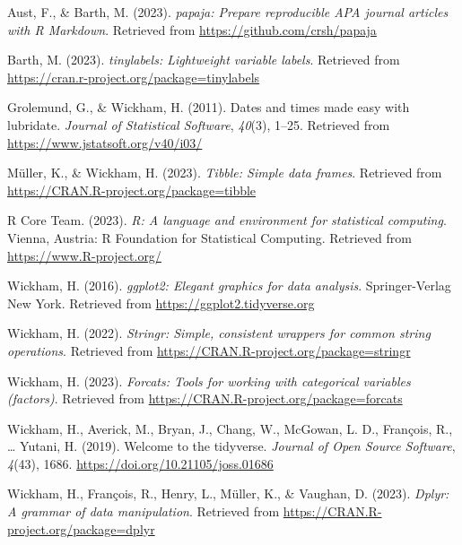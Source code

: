 \documentclass[
  man,floatsintext]{apa6}
\newlength{\cslhangindent}
\newlength{\cslentryspacingunit} %
\newenvironment{CSLReferences}[2] %
 {%
  \setlength{\parindent}{0pt}
  \ifodd #1
  \let\oldpar\par
  \def\par{\hangindent=\cslhangindent\oldpar}
  \fi
  \setlength{\parskip}{#2\cslentryspacingunit}
 }%
 {}
\begin{document}
\hypertarget{refs}{}
\begin{CSLReferences}{1}{0}
\leavevmode{}%
Aust, F., \& Barth, M. (2023). \emph{{papaja}: {Prepare} reproducible {APA} journal articles with {R Markdown}}. Retrieved from \url{https://github.com/crsh/papaja}

\leavevmode{}%
Barth, M. (2023). \emph{{tinylabels}: Lightweight variable labels}. Retrieved from \url{https://cran.r-project.org/package=tinylabels}

\leavevmode{}%
Grolemund, G., \& Wickham, H. (2011). Dates and times made easy with {lubridate}. \emph{Journal of Statistical Software}, \emph{40}(3), 1--25. Retrieved from \url{https://www.jstatsoft.org/v40/i03/}

\leavevmode{}%
Müller, K., \& Wickham, H. (2023). \emph{Tibble: Simple data frames}. Retrieved from \url{https://CRAN.R-project.org/package=tibble}

\leavevmode{}%
R Core Team. (2023). \emph{R: A language and environment for statistical computing}. Vienna, Austria: R Foundation for Statistical Computing. Retrieved from \url{https://www.R-project.org/}

\leavevmode{}%
Wickham, H. (2016). \emph{ggplot2: Elegant graphics for data analysis}. Springer-Verlag New York. Retrieved from \url{https://ggplot2.tidyverse.org}

\leavevmode{}%
Wickham, H. (2022). \emph{Stringr: Simple, consistent wrappers for common string operations}. Retrieved from \url{https://CRAN.R-project.org/package=stringr}

\leavevmode{}%
Wickham, H. (2023). \emph{Forcats: Tools for working with categorical variables (factors)}. Retrieved from \url{https://CRAN.R-project.org/package=forcats}

\leavevmode{}%
Wickham, H., Averick, M., Bryan, J., Chang, W., McGowan, L. D., François, R., \ldots{} Yutani, H. (2019). Welcome to the {tidyverse}. \emph{Journal of Open Source Software}, \emph{4}(43), 1686. \url{https://doi.org/10.21105/joss.01686}

\leavevmode{}%
Wickham, H., François, R., Henry, L., Müller, K., \& Vaughan, D. (2023). \emph{Dplyr: A grammar of data manipulation}. Retrieved from \url{https://CRAN.R-project.org/package=dplyr}


\end{CSLReferences}
\end{document}
